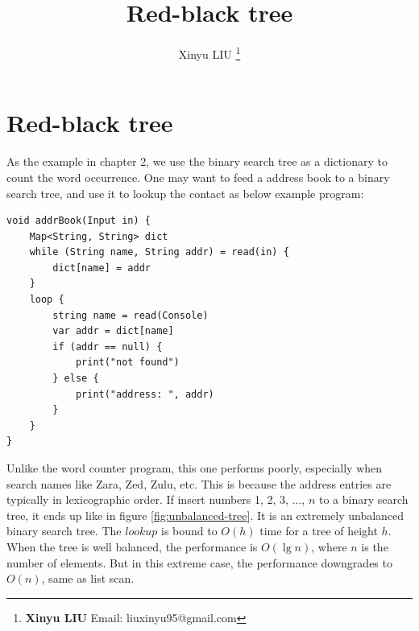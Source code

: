 \documentclass[b5paper]{article}
\begin{document}
\title{Red-black tree}

\author{Xinyu LIU
\thanks{{\bfseries Xinyu LIU} \newline
  Email: liuxinyu95@gmail.com \newline}
  }

\maketitle
\fi


\ifx\wholebook\relax
\chapter{Red-black tree}
\fi

As the example in chapter 2, we use the binary search tree as a dictionary to count the word occurrence. One may want to feed a address book to a binary search tree, and use it to lookup the contact as below example program:

\lstset{frame = single}
\begin{lstlisting}[language=Bourbaki]
void addrBook(Input in) {
    Map<String, String> dict
    while (String name, String addr) = read(in) {
        dict[name] = addr
    }
    loop {
        string name = read(Console)
        var addr = dict[name]
        if (addr == null) {
            print("not found")
        } else {
            print("address: ", addr)
        }
    }
}
\end{lstlisting}

Unlike the word counter program, this one performs poorly, especially when search names like Zara, Zed, Zulu, etc. This is because the address entries are typically in lexicographic order. If insert numbers 1, 2, 3, ..., $n$ to a binary search tree, it ends up like in figure \ref{fig:unbalanced-tree}. It is an extremely unbalanced binary search tree. The $lookup$ is bound to $O(h)$ time for a tree of height $h$. When the tree is well balanced, the performance is $O(\lg n)$, where $n$ is the number of elements. But in this extreme case, the performance downgrades to $O(n)$, same as list scan.
\end{document}
